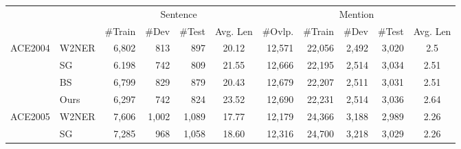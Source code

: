 \documentclass[11pt]{article}
\begin{document}
\begin{table*}[!ht]
\begin{table*}[]
  \centering
  \small
  \setlength{\tabcolsep}{3pt}
  \begin{tabular}{clrrrcrrrrc}
  \toprule
  \multicolumn{1}{l}{}     &       & \multicolumn{4}{c}{Sentence}                                                                                        & \multicolumn{5}{c}{Mention}                                                                            \\ \cmidrule(r){3-6} \cmidrule(r){7-11}
  \multicolumn{1}{l}{}     &       & \multicolumn{1}{l}{\#Train} & \multicolumn{1}{l}{\#Dev} & \multicolumn{1}{l}{\#Test} & \multicolumn{1}{l}{Avg. Len} & \multicolumn{1}{l}{\#Ovlp.} & \multicolumn{1}{l}{\#Train} & \multicolumn{1}{l}{\#Dev} & \multicolumn{1}{l}{\#Test} & \multicolumn{1}{l}{Avg. Len}  \\ \midrule
  \multirow{4}{*}{ACE2004} & W2NER & 6,802 & 813 & 897 & 20.12 & 12,571 & 22,056 & 2,492 & 3,020 & 2.5                         \\
                           & SG    & 6.198                        & 742                       & 809                        & 21.55                        & 12,666                       & 22,195                       & 2,514                      & 3,034                       & 2.51                         \\
                           & BS    & 6,799                        & 829                       & 879                        & 20.43                        & 12,679                       & 22,207                       & 2,511                      & 3,031                       & 2.51                         \\
                           & Ours  & 6,297                        & 742                       & 824                        & 23.52                        & 12,690                       & 22,231                       & 2,514                      & 3,036                       & 2.64                         \\
                           \midrule
  \multirow{4}{*}{ACE2005} & W2NER & 7,606 & 1,002 & 1,089 & 17.77 & 12,179 & 24,366 & 3,188 & 2,989 & 2.26                        \\
                           & SG    & 7,285                        & 968                       & 1,058                       & 18.60                         & 12,316                       & 24,700                       & 3,218                      & 3,029                       & 2.26                         \\

\end{tabular}
\end{table*}
\end{table*}
\end{document}
